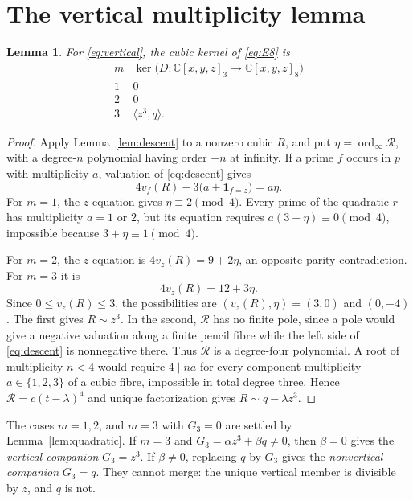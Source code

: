 \documentclass[11pt]{article}
\newtheorem{lemma}[theorem]{Lemma}
\theoremstyle{remark}
\newcommand{\C}{\mathbb C}
\newcommand{\ord}{\operatorname{ord}}
\begin{document}
\section{The vertical multiplicity lemma}

\begin{lemma}\label{lem:multiplicity}
For \eqref{eq:vertical}, the cubic kernel of \eqref{eq:E8} is
\[
\begin{array}{c|c}
 m&\ker\bigl(D:\C[x,y,z]_3\to\C[x,y,z]_8\bigr)\\ \hline
 1&0\\
 2&0\\
 3&\langle z^3,q\rangle .
\end{array}
\]
\end{lemma}

\begin{proof}
Apply Lemma~\ref{lem:descent} to a nonzero cubic $R$, and put
$\eta=\ord_\infty\mathcal R$, with a degree-$n$ polynomial having order
$-n$ at infinity.  If a prime $f$ occurs in $p$ with multiplicity $a$,
valuation of \eqref{eq:descent} gives
\begin{equation}
 4v_f(R)-3\bigl(a+\mathbf1_{f=z}\bigr)=a\eta.
 \label{eq:valuation}
\end{equation}
For $m=1$, the $z$-equation gives $\eta\equiv2\pmod4$.  Every prime of
the quadratic $r$ has multiplicity $a=1$ or $2$, but its equation requires
$a(3+\eta)\equiv0\pmod4$, impossible because
$3+\eta\equiv1\pmod4$.

For $m=2$, the $z$-equation is $4v_z(R)=9+2\eta$, an opposite-parity
contradiction.  For $m=3$ it is
\[
 4v_z(R)=12+3\eta.
\]
Since $0\le v_z(R)\le3$, the possibilities are
$(v_z(R),\eta)=(3,0)$ and $(0,-4)$.  The first gives
$R\sim z^3$.  In the second, $\mathcal R$ has no finite pole, since a
pole would give a negative valuation along a finite pencil fibre while the
left side of \eqref{eq:descent} is nonnegative there.  Thus $\mathcal R$ is
a degree-four polynomial.  A root of multiplicity $n<4$ would require
$4\mid na$ for every component multiplicity $a\in\{1,2,3\}$ of a cubic
fibre, impossible in total degree three.  Hence
$\mathcal R=c(t-\lambda)^4$ and unique factorization gives
$R\sim q-\lambda z^3$.
\end{proof}

The cases $m=1,2$, and $m=3$ with $G_3=0$ are settled by
Lemma~\ref{lem:quadratic}.  If $m=3$ and
$G_3=\alpha z^3+\beta q\ne0$, then $\beta=0$ gives the
\emph{vertical companion} $G_3=z^3$.  If $\beta\ne0$, replacing $q$ by
$G_3$ gives the \emph{nonvertical companion} $G_3=q$.  They cannot merge:
the unique vertical member is divisible by $z$, and $q$ is not.
\end{document}
